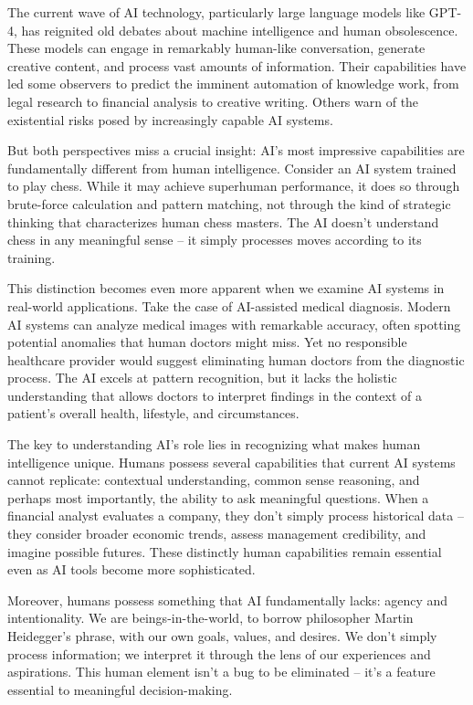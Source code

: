\documentclass[
  Letterpaper,
]{scrbook}
\begin{document}
The current wave of AI technology, particularly large language models
like GPT-4, has reignited old debates about machine intelligence and
human obsolescence. These models can engage in remarkably human-like
conversation, generate creative content, and process vast amounts of
information. Their capabilities have led some observers to predict the
imminent automation of knowledge work, from legal research to financial
analysis to creative writing. Others warn of the existential risks posed
by increasingly capable AI systems.

But both perspectives miss a crucial insight: AI's most impressive
capabilities are fundamentally different from human intelligence.
Consider an AI system trained to play chess. While it may achieve
superhuman performance, it does so through brute-force calculation and
pattern matching, not through the kind of strategic thinking that
characterizes human chess masters. The AI doesn't understand chess in
any meaningful sense -- it simply processes moves according to its
training.

This distinction becomes even more apparent when we examine AI systems
in real-world applications. Take the case of AI-assisted medical
diagnosis. Modern AI systems can analyze medical images with remarkable
accuracy, often spotting potential anomalies that human doctors might
miss. Yet no responsible healthcare provider would suggest eliminating
human doctors from the diagnostic process. The AI excels at pattern
recognition, but it lacks the holistic understanding that allows doctors
to interpret findings in the context of a patient's overall health,
lifestyle, and circumstances.

The key to understanding AI's role lies in recognizing what makes human
intelligence unique. Humans possess several capabilities that current AI
systems cannot replicate: contextual understanding, common sense
reasoning, and perhaps most importantly, the ability to ask meaningful
questions. When a financial analyst evaluates a company, they don't
simply process historical data -- they consider broader economic trends,
assess management credibility, and imagine possible futures. These
distinctly human capabilities remain essential even as AI tools become
more sophisticated.

Moreover, humans possess something that AI fundamentally lacks: agency
and intentionality. We are beings-in-the-world, to borrow philosopher
Martin Heidegger's phrase, with our own goals, values, and desires. We
don't simply process information; we interpret it through the lens of
our experiences and aspirations. This human element isn't a bug to be
eliminated -- it's a feature essential to meaningful decision-making.
\end{document}
